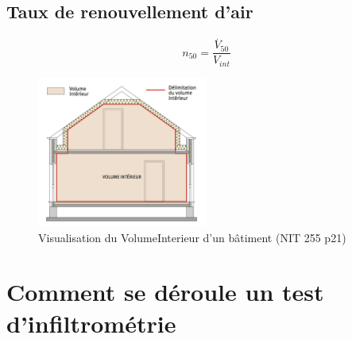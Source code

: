 \subsection{Taux de renouvellement d'air}

$$n_{50} =  \dfrac{\stackrel{.}{V}_{50}}{V_{int}}$$

\begin{figure}[h]
\centering
\includegraphics[width=0.5\textwidth]{VolumeInterieur}
\caption{\label{VolumeInterieur} Visualisation du VolumeInterieur d'un bâtiment (NIT 255 p21)}
\end{figure}


\section{Comment se déroule un test d'infiltrométrie}

